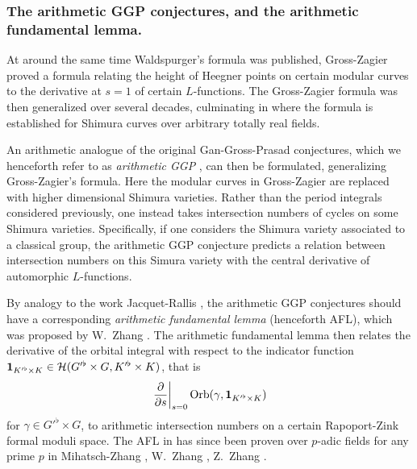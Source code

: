 \subsubsection{The arithmetic GGP conjectures, and the arithmetic fundamental lemma.}
At around the same time Waldspurger's formula was published,
Gross-Zagier \cite{ref:gross_zagier} proved a formula
relating the height of Heegner points
on certain modular curves to the derivative at $s=1$ of certain $L$-functions.
The Gross-Zagier formula was then generalized over several decades,
culminating in \cite{ref:GZshimura} where the formula is established
for Shimura curves over arbitrary totally real fields.

An arithmetic analogue of the original Gan-Gross-Prasad conjectures,
which we henceforth refer to as \emph{arithmetic GGP} \cite{ref:GGP},
can then be formulated, generalizing Gross-Zagier's formula.
Here the modular curves in Gross-Zagier
are replaced with higher dimensional Shimura varieties.
Rather than the period integrals considered previously,
one instead takes intersection numbers of cycles on some Shimura varieties.
Specifically, if one considers the Shimura variety associated to a classical group,
the arithmetic GGP conjecture predicts a relation between intersection numbers
on this Simura variety with the central derivative of automorphic $L$-functions.

By analogy to the work Jacquet-Rallis \cite{ref:JR},
the arithmetic GGP conjectures should have a corresponding
\emph{arithmetic fundamental lemma} (henceforth AFL),
which was proposed by W.\ Zhang \cite{ref:AFL}.
The arithmetic fundamental lemma then relates the derivative
of the orbital integral with respect to the indicator function
$\mathbf{1}_{K'^\flat \times K} \in \mathcal H(G'^\flat \times G, K'^\flat \times K)$, that is
\[ \left. \pdv{}{s} \right\rvert_{s=0} \operatorname{Orb}(\gamma, \mathbf{1}_{K'^\flat \times K}) \]
for $\gamma \in G'^\flat \times G$,
to arithmetic intersection numbers on a certain Rapoport-Zink formal moduli space.
The AFL in \cite{ref:AFL} has since been proven over $p$-adic fields for any prime $p$ in
Mihatsch-Zhang \cite{ref:MZ2021}, W.\ Zhang \cite{ref:Wei2021}, Z.\ Zhang \cite{ref:Zhiyu}.

